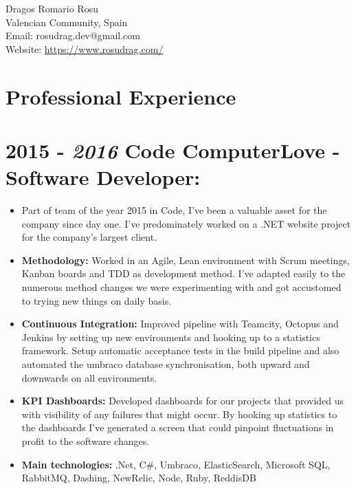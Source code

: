 \documentclass[12pt,a4paper]{res}
\begin{document}
\thispagestyle{empty}
  \begin{center}
  \Large{Dragos Romario Rosu  \\ [12pt]}
  \normalsize Valencian Community, Spain\\
  Email: rosudrag.dev@gmail.com\\
  Website: \url{https://www.rosudrag.com/}
  \end{center}
  
\begin{resume}
\vspace{-10mm}
\section{\large\bf Professional Experience}

\section{\bf 2015 - \textit{2016} \hspace{0.3mm} Code ComputerLove - Software Developer:}
\vspace{5mm}    
	\begin{itemize}
	\item[] Part of team of the year 2015 in Code, I've been a valuable asset for the company since day one. I've predominately worked on a .NET website project for the company's largest client.
	\item \textbf{Methodology:} Worked in an Agile, Lean environment with Scrum meetings, Kanban boards and TDD as development method. I've adapted easily to the numerous method changes we were experimenting with and got accustomed to trying new things on daily basis.
	\item \textbf{Continuous Integration:} Improved pipeline with Teamcity, Octopus and Jenkins by setting up new environments and hooking up to a statistics framework. Setup automatic acceptance tests in the build pipeline and also automated the umbraco database synchronisation, both upward and downwards on all environments.
	\item \textbf{KPI Dashboards:} Developed dashboards for our projects that provided us with visibility of any failures that might occur. By hooking up statistics to the dashboards I've generated a screen that could pinpoint fluctuations in profit to the software changes.
	\item \textbf{Main technologies:} .Net, C\#, Umbraco, ElasticSearch, Microsoft SQL, RabbitMQ, Dashing, NewRelic, Node, Ruby, ReddisDB
	\end{itemize}
	

\end{resume}
\end{document}
